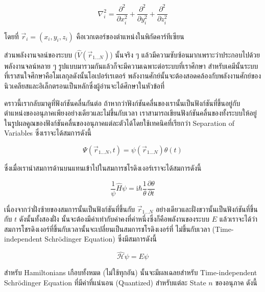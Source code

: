 \begin{equation}
    \label{eq:nabla}
    \nabla_i^2 
    = \frac{\partial^2}{\partial x_i^2} 
        + \frac{\partial^2}{\partial y_i^2} 
        + \frac{\partial^2}{\partial z_i^2}
\end{equation}

\noindent โดยที่ $\vec{r}_i = \left(x_i, y_i, z_i\right)$ คือเวกเตอร์ของตำแหน่งในพิกัดคาร์ทีเซียน 

ส่วนพลังงานจลน์ของระบบ ($\hat{V}\left(\vec{r}_{1 \ldots N}\right)$) นั้นจริง ๆ แล้วมีความซับซ้อนมากเพราะว่าประกอบไปด้วย%
พลังงานจลน์หลาย ๆ รูปแบบมารวมกันแล้วก็จะมีความเฉพาะต่อระบบที่เราศึกษา สำหรับเคมีนั้นระบบที่เราสนใจศึกษาคือโมเลกุลดังนั้นโอเปอร์เรเตอร์%
พลังงานศักย์นั้นจะต้องสอดคล้องกับพลังงานศักย์ของนิวเคลียสและอิเล็กตรอนเป็นหลักซึ่งผู้อ่านจะได้ศึกษาในหัวข้อที่ 

คราวนี้เรากลับมาดูที่ฟังก์ชันคลื่นกันต่อ ถ้าหากว่าฟังก์ชันคลื่นของเรานั้นเป็นฟังก์ชันที่ขึ้นอยู่กับตำแหน่งของอนุภาคเพียงอย่างเดียวและไม่ขึ้นกับเวลา 
เราสามารถเขียนฟังก์ชันคลื่นของทั้งระบบให้อยู่ในรูปผลคูณของฟังก์ชันคลื่นของอนุภาคแต่ละตัวได้โดยใช้เทคนิคที่เรียกว่า Separation of Variables 
ซึ่งเราจะได้สมการดังนี้

\begin{equation}
    \Psi\left(\vec{r}_{1 \ldots N}, t\right) = \psi\left(\vec{r}_{1 \ldots N}\right) \theta(t)
\end{equation}

\noindent ซึ่งเมื่อเรานำสมการด้านบนแทนเข้าไปในสมการชโรดิงเงอร์เราจะได้สมการดังนี้

\begin{equation}
    \frac{1}{\psi} \hat{H} \psi = \mathrm{i} \hbar \frac{1}{\theta} \frac{\partial \theta}{\partial t}
\end{equation}

เนื่องจากว่าฝั่งซ้ายของสมการนั้นเป็นฟังก์ชันที่ขึ้นกับ $\vec{r}_{1 . . . N}$ อย่างเดียวและฝั่งขวานั้นเป็นฟังก์ชันที่ขึ้นกับ $t$ ดังนั้นทั้งสองฝั่ง%
นั้นจะต้องมีค่าเท่ากับค่าคงที่ค่าหนึ่งซึ่งก็คือพลังานของระบบ $E$ แล้วเราจะได้ว่าสมการโชรดิงเงอร์ที่ขึ้นกับเวลานั้นจะเปลี่ยนเป็นสมการชโรดิงเงอร์ที่%
ไม่ขึ้นกับเวลา (Time-independent Schr\"{o}dinger Equation) ซึ่งมีสมการดังนี้

\begin{equation}
    \label{eq:time_independent_schrodinger}
    \hat{\mathscr{H}} \psi = E \psi
\end{equation}

สำหรับ Hamiltonians เกือบทั้งหมด (ไม่ใช้ทุกอัน) นั้นจะมีผลเฉลยสำหรับ Time-independent Schr\"{o}dinger Equation ที่มีค่าที่แน่นอน 
(Quantized) สำหรับแต่ละ State $n$ ของอนุภาค ดังนี้

